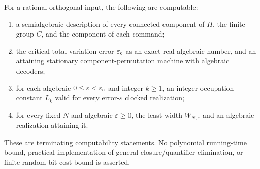 \begin{theorem}\label{thm:effective54}
For a rational orthogonal input, the following are computable:
\begin{enumerate}
\item a semialgebraic description of every connected component of $H$, the finite group $C$, and the component of each command;
\item the critical total-variation error $\varepsilon_{\mathrm c}$ as an exact real algebraic number, and an attaining stationary component-permutation machine with algebraic decoders;
\item for each algebraic $0\le\varepsilon<\varepsilon_{\mathrm c}$ and integer $k\ge1$, an integer occupation constant $L_k$ valid for every error-$\varepsilon$ clocked realization;
\item for every fixed $N$ and algebraic $\varepsilon\ge0$, the least width $W_{N,\varepsilon}$ and an algebraic realization attaining it.
\end{enumerate}
These are terminating computability statements. No polynomial running-time bound, practical implementation of general closure/quantifier elimination, or finite-random-bit cost bound is asserted.
\end{theorem}
